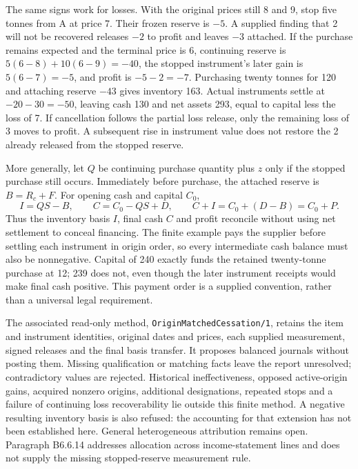The same signs work for losses. With the original prices still 8 and 9,
stop five tonnes from A at price 7. Their frozen reserve is \(-5\).
A supplied finding that 2 will not be recovered releases \(-2\) to profit
and leaves \(-3\) attached. If the purchase remains expected and the
terminal price is 6, continuing reserve is
\(5(6-8)+10(6-9)=-40\), the stopped instrument's later gain is
\(5(6-7)=-5\), and profit is \(-5-2=-7\).
Purchasing twenty tonnes for 120 and attaching reserve \(-43\) gives
inventory 163. Actual instruments settle at \(-20-30=-50\), leaving
cash 130 and net assets 293, equal to capital less the loss of 7.
If cancellation follows the partial loss release, only the remaining loss
of 3 moves to profit. A subsequent rise in instrument value does not restore
the 2 already released from the stopped reserve.

More generally, let \(Q\) be continuing purchase quantity plus \(z\) only
if the stopped purchase still occurs. Immediately before purchase, the
attached reserve is \(B=R_c+F\). For opening cash and capital \(C_0\),
\[
 I=QS-B,\qquad C=C_0-QS+D,\qquad
 C+I=C_0+(D-B)=C_0+P.
\]
Thus the inventory basis \(I\), final cash \(C\) and profit reconcile
without using net settlement to conceal financing. The finite example pays
the supplier before settling each instrument in origin order, so every
intermediate cash balance must also be nonnegative. Capital of 240 exactly
funds the retained twenty-tonne purchase at 12; 239 does not, even though
the later instrument receipts would make final cash positive. This payment
order is a supplied convention, rather than a universal legal requirement.

The associated read-only method, \texttt{OriginMatchedCessation/1}, retains
the item and instrument identities, original dates and prices, each supplied
measurement, signed releases and the final basis transfer. It proposes
balanced journals without posting them. Missing qualification or matching
facts leave the report unresolved; contradictory values are rejected.
Historical ineffectiveness, opposed active-origin gains, acquired nonzero
origins, additional designations, repeated stops and a failure of continuing
loss recoverability lie outside this finite method. A negative resulting
inventory basis is also refused: the accounting for that extension has not
been established here. General heterogeneous attribution remains open.
Paragraph B6.6.14 addresses allocation across income-statement lines and does
not supply the missing stopped-reserve measurement rule.
